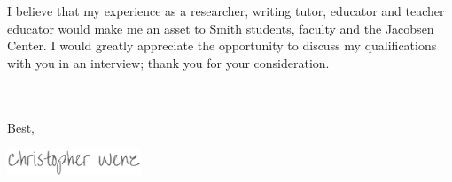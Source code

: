 \documentclass[11pt, a4paper]{awesome-cv}
\begin{document}
\begin{cvletter}
I believe that my experience as a researcher, writing tutor, educator and teacher educator would make me an asset to Smith students, faculty and the Jacobsen Center. I would greatly appreciate the opportunity to discuss my qualifications with you in an interview; thank you for your consideration. 

\\\\
Best,
\end{cvletter}



\includegraphics[width=4cm, height=0.8cm]{./img/sig.png}
\end{document}

